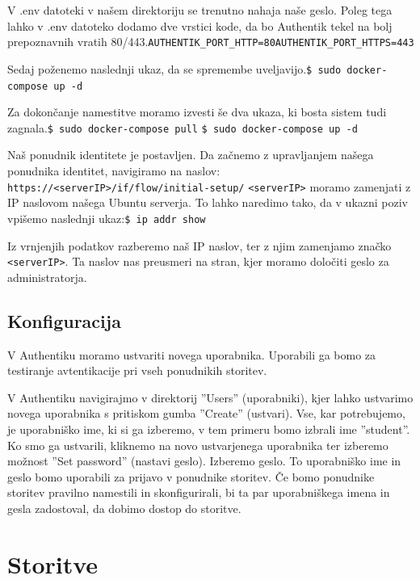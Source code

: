 \documentclass[a4paper,12pt,openright,oneside]{book}
\begin{document}
V .env datoteki v našem direktoriju se trenutno nahaja naše geslo. Poleg tega lahko v .env datoteko dodamo dve vrstici kode, da bo Authentik tekel na bolj prepoznavnih vratih 80/443.\newline\texttt{AUTHENTIK\_PORT\_HTTP=80}\newline\texttt{AUTHENTIK\_PORT\_HTTPS=443}

Sedaj poženemo naslednji ukaz, da se spremembe uveljavijo.\newline\texttt{\$ sudo docker-compose up -d}


Za dokončanje namestitve moramo izvesti še dva ukaza, ki bosta sistem tudi zagnala.\newline\texttt{\$ sudo docker-compose pull}\newline
\texttt{\$ sudo docker-compose up -d}


Naš ponudnik identitete je postavljen. Da začnemo z upravljanjem našega ponudnika identitet, navigiramo na naslov: 
\newline
\texttt{https://<serverIP>/if/flow/initial-setup/} 
\newline
\texttt{<serverIP>} moramo zamenjati z IP naslovom našega Ubuntu serverja. To lahko naredimo tako, da v ukazni poziv vpišemo naslednji ukaz:\newline\texttt{\$ ip addr show}


Iz vrnjenjih podatkov razberemo naš IP naslov, ter z njim zamenjamo značko \texttt{<serverIP>}. Ta naslov nas preusmeri na stran, kjer moramo določiti geslo za administratorja. 
\section{Konfiguracija}
V Authentiku moramo ustvariti novega uporabnika. Uporabili ga bomo za testiranje avtentikacije pri vseh ponudnikih storitev. 

V Authentiku navigirajmo v direktorij ''Users'' (uporabniki), kjer lahko ustvarimo novega uporabnika s pritiskom gumba ''Create'' (ustvari). Vse, kar potrebujemo, je uporabniško ime, ki si ga izberemo, v tem primeru bomo izbrali ime ''student''. Ko smo ga ustvarili, kliknemo na novo ustvarjenega uporabnika ter izberemo možnost ''Set password'' (nastavi geslo). Izberemo geslo.  To uporabniško ime in geslo bomo uporabili za prijavo v ponudnike storitev. Če bomo ponudnike storitev pravilno namestili in skonfigurirali, bi ta par uporabniškega imena in gesla zadostoval, da dobimo dostop do storitve.

\chapter{Storitve}
\end{document}
